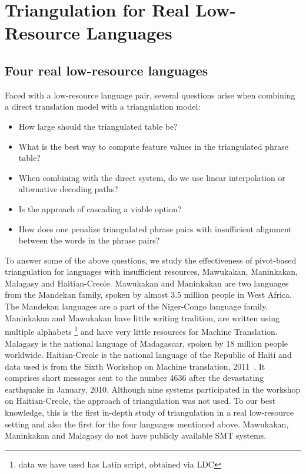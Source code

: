 \chapter{Triangulation for Real Low-Resource Languages}
\label{chapter:reality}

\section{Four real low-resource languages}

Faced with a low-resource language pair, several questions arise when combining a direct translation model with a triangulation model:
\begin{itemize}\addtolength{\itemsep}{-0.4\baselineskip}
        \item How large should the triangulated table be?
        \item What is the best way to compute feature values in the triangulated phrase table?
        \item When combining with the direct system, do we use linear interpolation or alternative decoding paths?
        \item Is the approach of cascading a viable option?
        \item How does one penalize triangulated phrase pairs with insufficient alignment between the words in the phrase pairs?
\end{itemize}

To answer some of the above questions, we study the effectiveness of pivot-based triangulation for languages with insufficient resources, Mawukakan, Maninkakan, Malagasy and Haitian-Creole. Mawukakan and Maninkakan are two languages from the Mandekan family, spoken by almost 3.5 million people in West Africa. The Mandekan languages are a part of the Niger-Congo language family. Maninkakan and Mawukakan have little writing tradition, are written using multiple alphabets \footnote{data we have used has Latin script, obtained via LDC} and have very little resources for Machine Translation. Malagasy is the national language of Madagascar, spoken by 18 million people worldwide. Haitian-Creole is the national language of the Republic of Haiti and data used is from the Sixth Workshop on Machine translation, 2011~\cite{WMT:11}. It comprises short messages sent to the number 4636 after the devastating earthquake in January, 2010. Although nine systems participated in the workshop on Haitian-Creole, the approach of triangulation was not used. To our best knowledge, this is the first in-depth study of triangulation in a real low-resource setting and also the first for the four languages mentioned above. Mawukakan, Maninkakan and Malagasy do not have publicly available SMT systems. 

